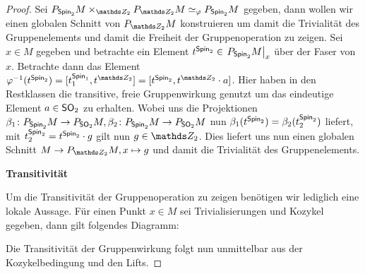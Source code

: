 \begin{Satz}
\begin{proof}
		Sei $ \Ph{\spin_2}{M} \times_{\Z_2} \Ph{\Z_2}{M} \simeq_\varphi \Ph{\spin_2}{M} $ gegeben, dann wollen wir einen globalen
		Schnitt von $ \Ph{\Z_2}{M} $ konstruieren um damit die 
		Trivialität des Gruppenelements und damit die Freiheit
		der Gruppenoperation zu zeigen.
		Sei $ x\in M $ gegeben und betrachte ein Element $ t^{\operatorname{\mathsf{Spin}}_2} \in \left.P_{\operatorname{\mathsf{Spin}}_2}M\right|_x $ über der Faser von $ x $.
		Betrachte dann das Element $ \varphi^{-1}(t^{\spin_2}) = [t_1^{\spin_1},t^{\Z_2}] = [t^{\spin_2},t^{\Z_2} \cdot a] $.
		Hier haben in den Restklassen die transitive, freie Gruppenwirkung genutzt um das eindeutige Element $ a\in \operatorname{\mathsf{SO}}_2 $
		zu erhalten. Wobei uns die Projektionen $ \beta_1 \colon P_{\operatorname{\mathsf{Spin}}_2}M \rightarrow P_{\operatorname{\mathsf{SO}}_2}M ,\beta_2 \colon P_{\operatorname{\mathsf{Spin}}_2}M \rightarrow P_{\operatorname{\mathsf{SO}}_2}M$
		nun $ \beta_1(t^{\operatorname{\mathsf{Spin}}_2}) = \beta_2(t_2^{\operatorname{\mathsf{Spin}}_2}) $ liefert,
		mit $ t_2^{\operatorname{\mathsf{Spin}}_2} = t^{\operatorname{\mathsf{Spin}}_2} \cdot g $ gilt nun
		$ g \in \Z_2 $. Dies liefert uns nun einen globalen Schnitt
		$ M  \to \Ph{\Z_2}{M} , x \mapsto g$ und damit die 
		Trivialität des Gruppenelements.
		
		\textbf{Transitivität}
		
		Um die Transitivität der Gruppenoperation zu zeigen 
		benötigen wir lediglich eine lokale Aussage.
		Für einen Punkt $ x\in M $ sei Trivialisierungen und
		Kozykel gegeben, dann gilt folgendes Diagramm:
		\begin{center}
		\end{center}
		Die Transitivität der Gruppenwirkung folgt nun unmittelbar
		aus der Kozykelbedingung und den Lifts.
		
	\end{proof}
\end{Satz}

